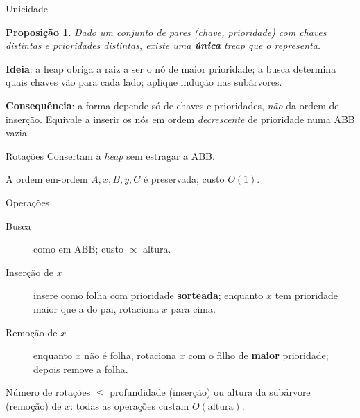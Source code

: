 \documentclass[aspectratio=169,11pt]{beamer}
\newcommand{\tri}[3]{%
  \draw (#1,#2) -- ++(-.45,-.9) -- ++(.9,0) -- cycle;
  \node at (#1,#2-.65) {#3};}
\newtheorem{proposicao}[teorema]{Proposição}
\theoremstyle{definition}
\begin{document}
\begin{frame}{Unicidade}
  \begin{proposicao}
    Dado um conjunto de pares (chave, prioridade) com chaves distintas
    e prioridades distintas, existe uma \textbf{única} treap que o
    representa.
  \end{proposicao}
  \pause
  \textbf{Ideia}: a heap obriga a raiz a ser o nó de maior prioridade;
  a busca determina quais chaves vão para cada lado; aplique indução
  nas subárvores.
  \pause
  \medskip

  \textbf{Consequência}: a forma depende só de chaves e prioridades,
  \emph{não} da ordem de inserção.  Equivale a inserir os nós em ordem
  \emph{decrescente} de prioridade numa ABB vazia.
\end{frame}

\begin{frame}{Rotações}
  Consertam a \textit{heap} sem estragar a ABB.

  \vfill

  \centering

  \medskip
  A ordem em-ordem $A,x,B,y,C$ é preservada; custo $O(1)$.
\end{frame}

\begin{frame}{Operações}
  \begin{description}
  \item[Busca] como em ABB; custo $\propto$ altura.
  \pause
  \item[Inserção de $x$] insere como folha com prioridade
    \textbf{sorteada}; enquanto $x$ tem prioridade maior que a do pai,
    rotaciona $x$ para cima.
  \pause
  \item[Remoção de $x$] enquanto $x$ não é folha, rotaciona $x$ com o
    filho de \textbf{maior} prioridade; depois remove a folha.
  \end{description}
  \pause
  \medskip
  Número de rotações $\le$ profundidade (inserção) ou altura da
  subárvore (remoção) de $x$: todas as operações custam $O(\text{altura})$.
\end{frame}
\end{document}
